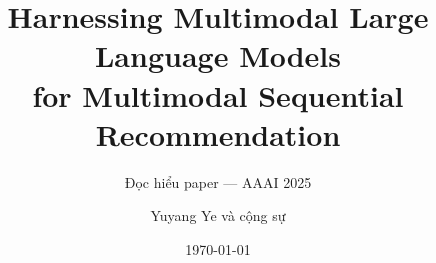 \title[MLLM-MSR]{Harnessing Multimodal Large Language Models\\for Multimodal Sequential Recommendation}
\subtitle{Đọc hiểu paper — AAAI 2025}
\author[MLLM-MSR]{\footnotesize Yuyang Ye và cộng sự}
\date{\today}

